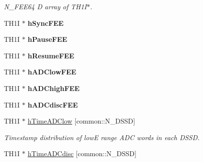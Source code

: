 \begin{DoxyCompactItemize}
\begin{DoxyCompactList}\small\item\em N\-\_\-\-F\-E\-E64 D array of T\-H1\-I$\ast$. \end{DoxyCompactList}\item 
\hypertarget{classAnalysis_a391963b0a1b014db32a570e9806a8a30}{T\-H1\-I $\ast$ {\bfseries h\-Sync\-F\-E\-E}}\label{classAnalysis_a391963b0a1b014db32a570e9806a8a30}

\item 
\hypertarget{classAnalysis_ad03dfce7cff1ed29eb6fd102e8f0aec1}{T\-H1\-I $\ast$ {\bfseries h\-Pause\-F\-E\-E}}\label{classAnalysis_ad03dfce7cff1ed29eb6fd102e8f0aec1}

\item 
\hypertarget{classAnalysis_a782c7ec1e0431c38caaf5653797e68fa}{T\-H1\-I $\ast$ {\bfseries h\-Resume\-F\-E\-E}}\label{classAnalysis_a782c7ec1e0431c38caaf5653797e68fa}

\item 
\hypertarget{classAnalysis_a107620bb942cbd9e4a436983074547e0}{T\-H1\-I $\ast$ {\bfseries h\-A\-D\-Clow\-F\-E\-E}}\label{classAnalysis_a107620bb942cbd9e4a436983074547e0}

\item 
\hypertarget{classAnalysis_ab43fcf73d097cd5bff942710fc31ecc6}{T\-H1\-I $\ast$ {\bfseries h\-A\-D\-Chigh\-F\-E\-E}}\label{classAnalysis_ab43fcf73d097cd5bff942710fc31ecc6}

\item 
\hypertarget{classAnalysis_aef2c732fbf29a8bdad95738b36fb6472}{T\-H1\-I $\ast$ {\bfseries h\-A\-D\-Cdisc\-F\-E\-E}}\label{classAnalysis_aef2c732fbf29a8bdad95738b36fb6472}

\item 
\hypertarget{classAnalysis_a3b091296cf864e881769cc54e35b88df}{T\-H1\-I $\ast$ \hyperlink{classAnalysis_a3b091296cf864e881769cc54e35b88df}{h\-Time\-A\-D\-Clow} \mbox{[}common\-::\-N\-\_\-\-D\-S\-S\-D\mbox{]}}\label{classAnalysis_a3b091296cf864e881769cc54e35b88df}

\begin{DoxyCompactList}\small\item\em Timestamp distribution of low\-E range A\-D\-C words in each D\-S\-S\-D. \end{DoxyCompactList}\item 
\hypertarget{classAnalysis_aad6f919ab70c7403b7cefeb8c7ca647c}{T\-H1\-I $\ast$ \hyperlink{classAnalysis_aad6f919ab70c7403b7cefeb8c7ca647c}{h\-Time\-A\-D\-Cdisc} \mbox{[}common\-::\-N\-\_\-\-D\-S\-S\-D\mbox{]}}\label{classAnalysis_aad6f919ab70c7403b7cefeb8c7ca647c}


\end{DoxyCompactItemize}
